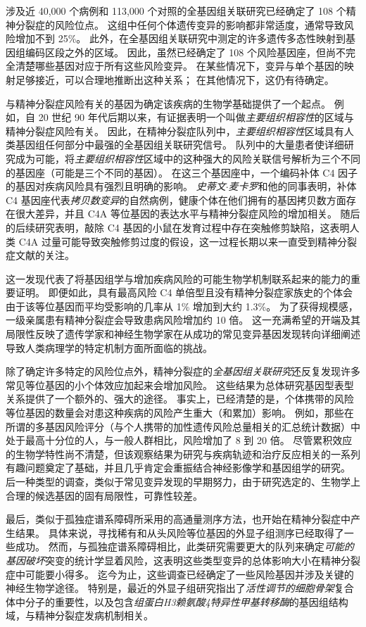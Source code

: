 涉及近 40,000 个病例和 113,000 个对照的全基因组关联研究已经确定了 108 个精神分裂症的风险位点。 
这组中任何个体遗传变异的影响都非常适度，通常导致风险增加不到 25\%。
此外，在全基因组关联研究中测定的许多遗传多态性映射到基因组编码区段之外的区域。
因此，虽然已经确定了 108 个风险基因座，但尚不完全清楚哪些基因对应于所有这些风险变异。
在某些情况下，变异与单个基因的映射足够接近，可以合理地推断出这种关系；
在其他情况下，这仍有待确定。


与精神分裂症风险有关的基因为确定该疾病的生物学基础提供了一个起点。
例如，自 20 世纪 90 年代后期以来，有证据表明一个叫做\textit{主要组织相容性}的区域与精神分裂症风险有关。
因此，在精神分裂症队列中，\textit{主要组织相容性}区域具有人类基因组任何部分中最强的全基因组关联研究信号。
队列中的大量患者使详细研究成为可能，将\textit{主要组织相容性}区域中的这种强大的风险关联信号解析为三个不同的基因座（可能是三个不同的基因）。
在这三个基因座中，一个编码补体 C4 因子的基因对疾病风险具有强烈且明确的影响。
\textit{史蒂文$\cdot$麦卡罗}和他的同事表明，补体 C4 基因座代表\textit{拷贝数变异}的自然病例，健康个体在他们拥有的基因拷贝数方面存在很大差异，并且 C4A 等位基因的表达水平与精神分裂症风险的增加相关。
随后的后续研究表明，敲除 C4 基因的小鼠在发育过程中存在突触修剪缺陷，这表明人类 C4A 过量可能导致突触修剪过度的假设，这一过程长期以来一直受到精神分裂症文献的关注。


这一发现代表了将基因组学与增加疾病风险的可能生物学机制联系起来的能力的重要证明。
即便如此，具有最高风险 C4 单倍型且没有精神分裂症家族史的个体会由于该等位基因而平均受影响的几率从 1\% 增加到大约 1.3\%。
为了获得规模感，一级亲属患有精神分裂症会导致患病风险增加约 10 倍。
这一充满希望的开端及其局限性反映了遗传学家和神经生物学家在从成功的常见变异基因发现转向详细阐述导致人类病理学的特定机制方面所面临的挑战。


除了确定许多特定的风险位点外，精神分裂症的\textit{全基因组关联研究}还反复发现许多常见等位基因的小个体效应加起来会增加风险。
这些结果为总体研究基因型表型关系提供了一个额外的、强大的途径。
事实上，已经清楚的是，个体携带的风险等位基因的数量会对患这种疾病的风险产生重大（和累加）影响。
例如，那些在所谓的多基因风险评分（与个人携带的加性遗传风险总量相关的汇总统计数据）中处于最高十分位的人，与一般人群相比，风险增加了 8 到 20 倍。
尽管累积效应的生物学特性尚不清楚，但该观察结果为研究与疾病轨迹和治疗反应相关的一系列有趣问题奠定了基础，并且几乎肯定会重振结合神经影像学和基因组学的研究。
后一种类型的调查，类似于常见变异发现的早期努力，由于研究选定的、生物学上合理的候选基因的固有局限性，可靠性较差。


最后，类似于孤独症谱系障碍所采用的高通量测序方法，也开始在精神分裂症中产生结果。
具体来说，寻找稀有和从头风险等位基因的外显子组测序已经取得了一些成功。
然而，与孤独症谱系障碍相比，此类研究需要更大的队列来确定\textit{可能的基因破坏}突变的统计学显着风险，这表明这些类型变异的总体影响大小在精神分裂症中可能要小得多。
迄今为止，这些调查已经确定了一些风险基因并涉及关键的神经生物学途径。
特别是，最近的外显子组研究指出了\textit{活性调节的细胞骨架}复合体中分子的重要性，以及包含\textit{组蛋白H3赖氨酸4特异性甲基转移酶}的基因组结构域，与精神分裂症发病机制相关。



